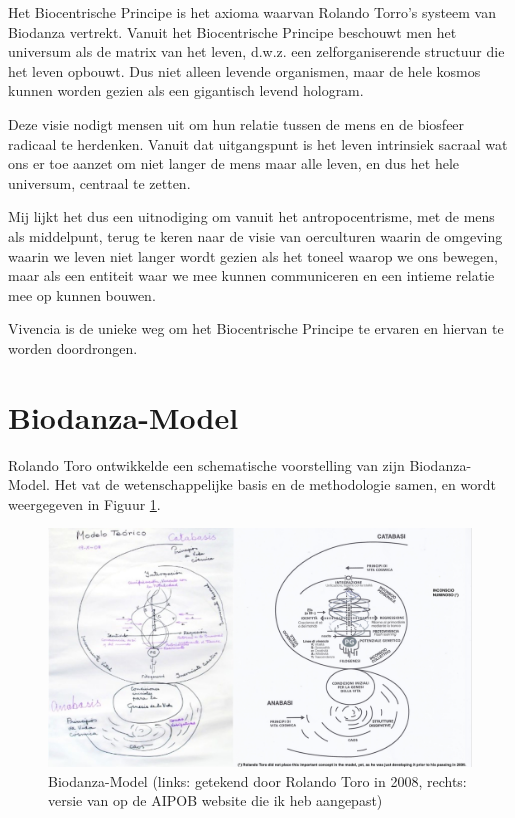 \documentclass[
  11pt,
]{book}
\begin{document}
Het Biocentrische Principe is het axioma waarvan Rolando Torro's systeem van Biodanza vertrekt. Vanuit het Biocentrische Principe beschouwt men het universum als de matrix van het leven, d.w.z. een zelforganiserende structuur die het leven opbouwt. Dus niet alleen levende organismen, maar de hele kosmos kunnen worden gezien als een gigantisch levend hologram.

Deze visie nodigt mensen uit om hun relatie tussen de mens en de biosfeer radicaal te herdenken. Vanuit dat uitgangspunt is het leven intrinsiek sacraal wat ons er toe aanzet om niet langer de mens maar alle leven, en dus het hele universum, centraal te zetten.

Mij lijkt het dus een uitnodiging om vanuit het antropocentrisme, met de mens als middelpunt, terug te keren naar de visie van oerculturen waarin de omgeving waarin we leven niet langer wordt gezien als het toneel waarop we ons bewegen, maar als een entiteit waar we mee kunnen communiceren en een intieme relatie mee op kunnen bouwen.

Vivencia is de unieke weg om het Biocentrische Principe te ervaren en hiervan te worden doordrongen.

\hypertarget{sectionModelOfBiodanza}{%
\section{Biodanza-Model}\label{sectionModelOfBiodanza}}

Rolando Toro ontwikkelde een schematische voorstelling van zijn Biodanza-Model. Het vat de wetenschappelijke basis en de methodologie samen, en wordt weergegeven in Figuur \ref{fig:model}.

\begin{figure}

{\centering \includegraphics[width=1\linewidth]{./figs/biodanzamodel2andRolando} 

}

\caption{Biodanza-Model (links: getekend door Rolando Toro in 2008, rechts: versie van op de AIPOB website die ik heb aangepast)}\label{fig:model}
\end{figure}
\end{document}
